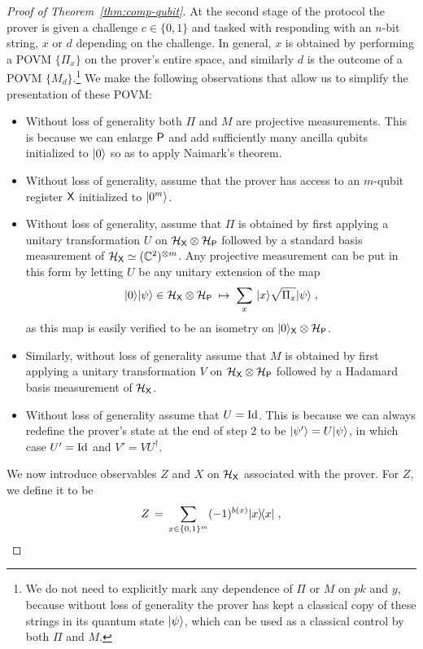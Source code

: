 \begin{proof}[Proof of Theorem~\ref{thm:comp-qubit}]
At the second stage of the protocol the prover is given a challenge $c\in\{0,1\}$ and tasked with responding with an $n$-bit string, $x$ or $d$ depending on the challenge. In general, $x$ is obtained by performing a POVM $\{\Pi_x\}$ on the prover's entire space, and similarly $d$ is the outcome of a POVM $\{M_d\}$.\footnote{We do not need to explicitly mark any dependence of $\Pi$ or $M$ on $pk$ and $y$, because without loss of generality the prover has kept a classical copy of these strings in its quantum state $|\psi\rangle$, which can be used as a classical control by both $\Pi$ and $M$.} We make the following observations that allow us to simplify the presentation of these POVM:
\begin{itemize}
\item Without loss of generality both $\Pi$ and $M$ are projective measurements. This is because we can enlarge ${\textsf{P}}$ and add sufficiently many ancilla qubits initialized to $|0\rangle$ so as to apply Naimark's theorem. 
\item Without loss of generality, assume that the prover has access to an $m$-qubit register ${\textsf{X}}$ initialized to $|0^m\rangle$. 
\item Without loss of generality, assume that $\Pi$ is obtained by first applying a unitary transformation $U$ on $\mathcal{H}_{\textsf{X}} \otimes \mathcal{H}_{{\textsf{P}}}$ followed by a standard basis measurement of $\mathcal{H}_{\textsf{X}}  \simeq (\mathbb{C}^2)^{\otimes m}$. Any projective measurement can be put in this form by letting $U$ be any unitary extension of the map 
\[|0\rangle|\psi\rangle\in \mathcal{H}_{\textsf{X}}\otimes \mathcal{H}_{\textsf{P}}\; \mapsto\; \sum_x \,|x\rangle \sqrt{\Pi_x} |\psi\rangle\;,\]
 as this map is easily verified to be an isometry on $|0\rangle_{\textsf{X}}\otimes \mathcal{H}_{\textsf{P}}$. 
\item Similarly, without loss of generality assume that $M$ is obtained by first applying a unitary transformation $V$ on $\mathcal{H}_{\textsf{X}} \otimes \mathcal{H}_{{\textsf{P}}}$ followed by a Hadamard basis measurement of $\mathcal{H}_{\textsf{X}}$.
\item Without loss of generality assume that $U = \mathop{\rm Id}\nolimits$. This is because we can always redefine the prover's state at the end of step 2 to be $|\psi'\rangle = U|\psi\rangle$, in which case $U'=\mathop{\rm Id}\nolimits$ and $V'=VU^\dagger$. 
\end{itemize}
We now introduce observables $Z$ and $X$ on $\mathcal{H}_{\textsf{X}}$ associated with the prover. For $Z$, we define it to be 
\begin{equation}\label{eq:comp-qubit-proof-1a}
Z \,=\, \sum_{x\in\{0,1\}^m} (-1)^{b(x)} |x\rangle\!\langle x|\;,
\end{equation}

\end{proof}
